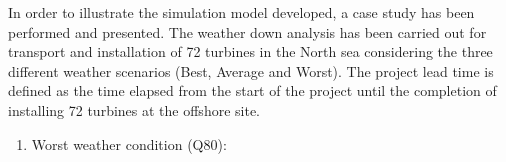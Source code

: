 In order to illustrate the simulation model developed, a case study has been performed and presented. The weather down analysis has been carried out for transport and installation of 72 turbines in the North sea considering the three different weather scenarios (Best, Average and Worst). The project lead time is defined as the time elapsed from the start of the project until the completion of installing 72 turbines at the offshore site. 
\begin{enumerate}
\item
Worst weather condition (Q80):
\end{enumerate}
